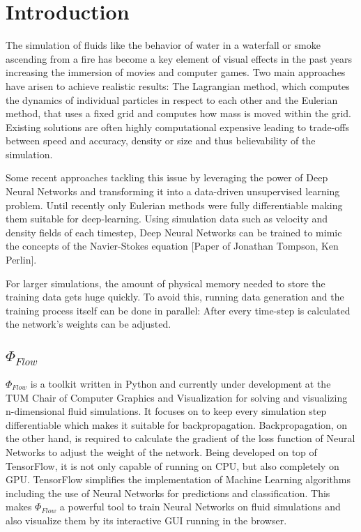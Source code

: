 \chapter{Introduction}\label{chapter:introduction}
The simulation of fluids like the behavior of water in a waterfall or smoke ascending from a fire has become a key element of visual effects in the past years increasing the immersion of movies and computer games. Two main approaches have arisen to achieve realistic results: The Lagrangian method, which computes the dynamics of individual particles in respect to each other and the Eulerian method, that uses a fixed grid and computes how mass is moved within the grid. Existing solutions are often highly computational expensive leading to trade-offs between speed and accuracy, density or size and thus believability of the simulation.
\par Some recent approaches tackling this issue by leveraging the power of Deep Neural Networks and transforming it into a data-driven unsupervised learning problem. Until recently only Eulerian methods were fully differentiable making them suitable for deep-learning. Using simulation data such as velocity and density fields of each timestep, Deep Neural Networks can be trained to mimic the concepts of the Navier-Stokes equation [Paper of Jonathan Tompson, Ken Perlin].
\par For larger simulations, the amount of physical memory needed to store the training data gets huge quickly. To avoid this, running data generation and the training process itself can be done in parallel: After every time-step is calculated the network's weights can be adjusted.
\section{$\Phi_\textit{Flow}$ }
$\Phi_\textit{Flow}$ is a toolkit written in Python and currently under development at the TUM Chair of Computer Graphics and Visualization for solving and visualizing n-dimensional fluid simulations. It focuses on to keep every simulation step differentiable which makes it suitable for backpropagation. Backpropagation, on the other hand, is required to calculate the gradient of the loss function of Neural Networks to adjust the weight of the network. Being developed on top of TensorFlow, it is not only capable of running on CPU, but also completely on GPU. TensorFlow simplifies the implementation of Machine Learning algorithms including the use of Neural Networks for predictions and classification. This makes $\Phi_\textit{Flow}$ a powerful tool to train Neural Networks on fluid simulations and also visualize them by its interactive GUI running in the browser. 
